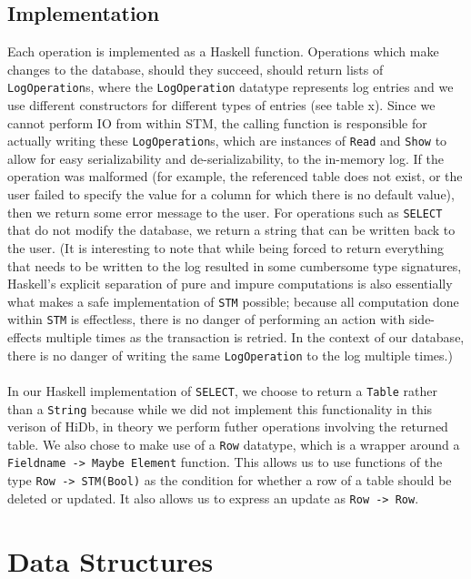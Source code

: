 \documentclass[10pt]{article}
\begin{document}
\begin{multicols}{2}
\subsection{Implementation}
Each operation is implemented as a Haskell function.  Operations which make changes to the database, should they succeed, should return lists of \texttt{LogOperation}s, where the \texttt{LogOperation} datatype represents log entries and we use different constructors for different types of entries (see table x). Since we cannot perform IO from within STM, the calling function is responsible for actually writing these \texttt{LogOperation}s, which are instances of \texttt{Read} and \texttt{Show} to allow for easy serializability and de-serializability, to the in-memory log. If the operation was malformed (for example, the referenced table does not exist, or the user failed to specify the value for a column for which there is no default value), then we return some error message to the user. For operations such as \texttt{SELECT} that do not modify the database, we return a string that can be written back to the user. (It is interesting to note that while being forced to return everything that needs to be written to the log resulted in some cumbersome type signatures, 
Haskell's explicit separation of pure and impure computations is also essentially what makes a safe implementation of \texttt{STM} possible; because all computation done within \texttt{STM} is effectless, there is no danger of performing an action with side-effects multiple times as the transaction is retried. In the context of our database, there is no danger of writing the same \texttt{LogOperation} to the log multiple times.) \\\\
In our Haskell implementation of \texttt{SELECT}, we choose to return a \texttt{Table} rather than a \texttt{String} because while we did not implement this functionality in this verison of HiDb, in theory we perform futher operations involving the returned table. We also chose to make use of a \texttt{Row} datatype, which is a wrapper around a \texttt{Fieldname -> Maybe Element} function. This allows us to use functions of the type \texttt{Row -> STM(Bool)} as the condition for whether a row of a table should be deleted or updated. It also allows us to express an update as \texttt{Row -> Row}. 

\section{Data Structures}


\end{multicols}
\end{document}
